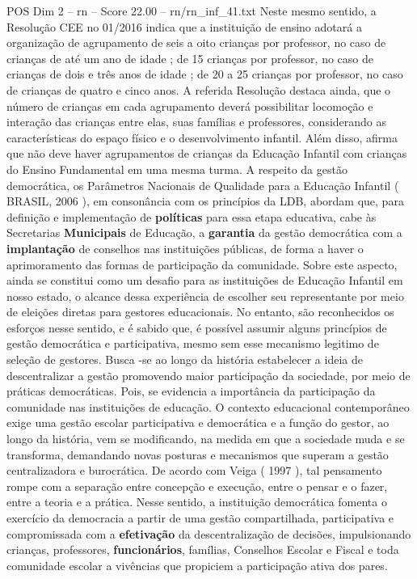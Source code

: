 \begin{textsample}{POS Dim 2 – rn – Score 22.00 – rn/rn\_inf\_41.txt}
Neste mesmo sentido, a Resolução CEE no 01/2016 indica que a instituição de ensino adotará a organização de agrupamento de seis a oito crianças por professor, no caso de crianças de até um ano de idade ; de 15 crianças por professor, no caso de crianças de dois e três anos de idade ; de 20 a 25 crianças por professor, no caso de crianças de quatro e cinco anos.
A referida Resolução destaca ainda, que o número de crianças em cada agrupamento deverá possibilitar locomoção e interação das crianças entre elas, suas famílias e professores, considerando as características do espaço físico e o desenvolvimento infantil.
Além disso, afirma que não deve haver agrupamentos de crianças da Educação Infantil com crianças do Ensino Fundamental em uma mesma turma.
A respeito da gestão democrática, os Parâmetros Nacionais de Qualidade para a Educação Infantil ( BRASIL, 2006 ), em consonância com os princípios da LDB, abordam que, para definição e implementação de \textbf{políticas} para essa etapa educativa, cabe às Secretarias \textbf{Municipais} de Educação, a \textbf{garantia} da gestão democrática com a \textbf{implantação} de conselhos nas instituições públicas, de forma a haver o aprimoramento das formas de participação da comunidade.
Sobre este aspecto, ainda se constitui como um desafio para as instituições de Educação Infantil em nosso estado, o alcance dessa experiência de escolher seu representante por meio de eleições diretas para gestores educacionais.
No entanto, são reconhecidos os esforços nesse sentido, e é sabido que, é possível assumir alguns princípios de gestão democrática e participativa, mesmo sem esse mecanismo legitimo de seleção de gestores.
Busca -se ao longo da história estabelecer a ideia de descentralizar a gestão promovendo maior participação da sociedade, por meio de práticas democráticas.
Pois, se evidencia a importância da participação da comunidade nas instituições de educação.
O contexto educacional contemporâneo exige uma gestão escolar participativa e democrática e a função do gestor, ao longo da história, vem se modificando, na medida em que a sociedade muda e se transforma, demandando novas posturas e mecanismos que superam a gestão centralizadora e burocrática.
De acordo com Veiga ( 1997 ), tal pensamento rompe com a separação entre concepção e execução, entre o pensar e o fazer, entre a teoria e a prática.
Nesse sentido, a instituição democrática fomenta o exercício da democracia a partir de uma gestão compartilhada, participativa e compromissada com a \textbf{efetivação} da descentralização de decisões, impulsionando crianças, professores, \textbf{funcionários}, famílias, Conselhos Escolar e Fiscal e toda comunidade escolar a vivências que propiciem a participação ativa dos pares.

\end{textsample}
